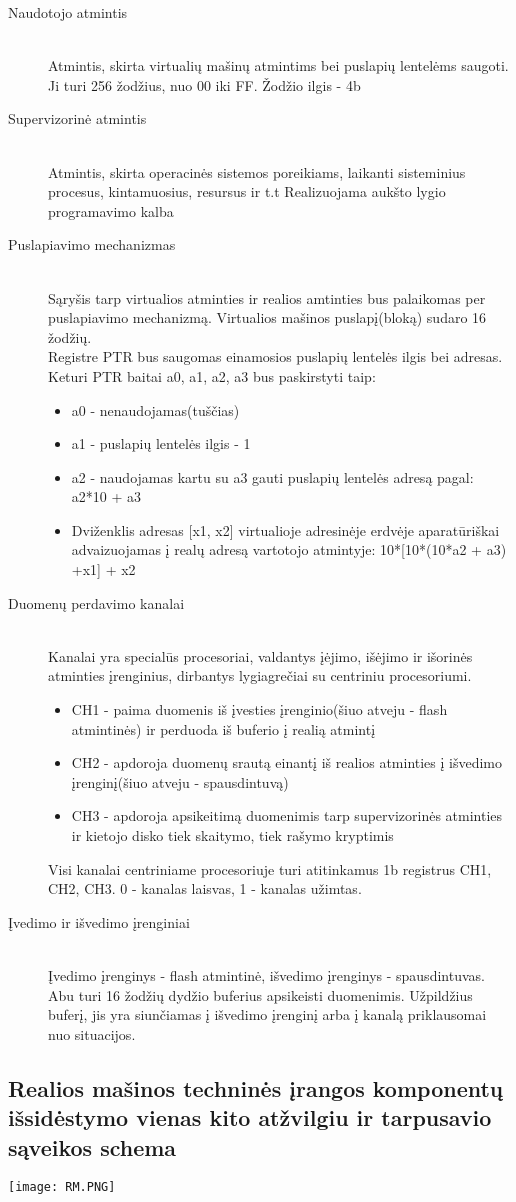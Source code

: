 \begin{description}
  \item[Naudotojo atmintis] \leavevmode \\
Atmintis, skirta virtualių mašinų atmintims bei puslapių lentelėms saugoti. Ji turi 256 žodžius, nuo 00 iki FF. Žodžio ilgis - 4b
  \item[Supervizorinė atmintis] \leavevmode \\
Atmintis, skirta operacinės sistemos poreikiams, laikanti sisteminius procesus, kintamuosius, resursus ir t.t Realizuojama aukšto lygio programavimo kalba

\item[Puslapiavimo mechanizmas] \leavevmode \\
Sąryšis tarp virtualios atminties ir realios amtinties bus palaikomas per puslapiavimo mechanizmą. Virtualios mašinos puslapį(bloką) sudaro 16 žodžių.
\\ Registre PTR bus saugomas einamosios puslapių lentelės ilgis bei adresas. Keturi PTR baitai a0, a1, a2, a3 bus paskirstyti taip:
\begin{itemize}
\item a0 - nenaudojamas(tuščias)
\item a1 - puslapių lentelės ilgis - 1
\item a2 - naudojamas kartu su a3 gauti puslapių lentelės adresą pagal: a2*10 + a3
\item Dviženklis adresas [x1, x2]  virtualioje adresinėje erdvėje aparatūriškai advaizuojamas į realų adresą vartotojo atmintyje: 10*[10*(10*a2 + a3) +x1] + x2
\end{itemize}

  \item[Duomenų perdavimo kanalai] \leavevmode \\
Kanalai yra specialūs procesoriai, valdantys įėjimo, išėjimo ir išorinės atminties įrenginius, dirbantys lygiagrečiai su centriniu procesoriumi.
\begin{itemize}
  \item CH1 - paima duomenis iš įvesties įrenginio(šiuo atveju - flash atmintinės) ir perduoda iš buferio į realią atmintį
  \item CH2 - apdoroja duomenų srautą einantį iš realios atminties į išvedimo įrenginį(šiuo atveju - spausdintuvą)
  \item CH3 - apdoroja apsikeitimą duomenimis tarp supervizorinės atminties ir kietojo disko tiek skaitymo, tiek rašymo kryptimis
\end{itemize}
Visi kanalai centriniame procesoriuje turi atitinkamus 1b registrus CH1, CH2, CH3. 0 - kanalas laisvas, 1 - kanalas užimtas.


  \item[Įvedimo ir išvedimo įrenginiai] \leavevmode \\
Įvedimo įrenginys - flash atmintinė, išvedimo įrenginys - spausdintuvas. Abu turi 16 žodžių dydžio buferius apsikeisti duomenimis. Užpildžius buferį, jis yra siunčiamas
į išvedimo įrenginį arba į kanalą priklausomai nuo situacijos.



\end{description}

\subsection{Realios mašinos techninės įrangos komponentų išsidėstymo vienas kito atžvilgiu ir tarpusavio sąveikos schema}
\texttt{[image: RM.PNG]}
